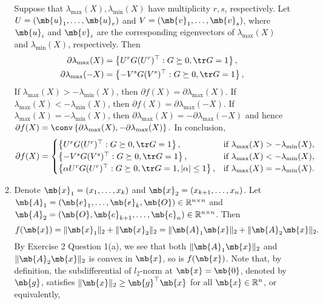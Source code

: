 \begin{exercise}[Subdifferentials]
\begin{enumerate}
\begin{solution}
\begin{enumerate}
            Suppose that $\lambda_{\max}(X),\lambda_{\min}(X)$ have multiplicity $r,s$, respectively. Let $U = (\mb{u}_1,\dots,\mb{u}_r)$ and $V = (\mb{v}_1,\dots,\mb{v}_s)$, where $\mb{u}_i$ and $\mb{v}_i$ are the corresponding eigenvectors of $\lambda_{\max}(X)$ and $\lambda_{\min}(X)$, respectively. Then
            \begin{gather*}
              \partial \lambda_{\max}(X) = \left\{U^r G (U^r)^\top : G \succeq 0, \tr G = 1\right\},\\
              \partial \lambda_{\max}(-X) = \left\{-V^s G (V^s)^\top : G \succeq 0, \tr G = 1\right\},
            \end{gather*}
            If $\lambda_{\max}(X) > -\lambda_{\min}(X)$, then $\partial f(X) = \partial \lambda_{\max}(X)$. If $\lambda_{\max}(X) < -\lambda_{\min}(X)$, then $\partial f(X) = \partial \lambda_{\max}(-X)$. If $\lambda_{\max}(X) = -\lambda_{\min}(X)$, then $\partial \lambda_{\max}(X) = -\partial \lambda_{\max}(-X)$ and hence $\partial f(X) = \conv \left\{\partial \lambda_{\max}(X), -\partial \lambda_{\max}(X)\right\}.$ In conclusion,
            $$
              \partial f(X) = \begin{cases}
                \left\{U^r G (U^r)^\top : G \succeq 0, \tr G = 1\right\},                        & \text{if } \lambda_{\max}(X) > -\lambda_{\min}(X),  \\
                \left\{-V^s G (V^s)^\top : G \succeq 0, \tr G = 1\right\},                       & \text{if } \lambda_{\max}(X) < -\lambda_{\min}(X),  \\
                \left\{\alpha U^r G (U^r)^\top : G \succeq 0, \tr G = 1, |\alpha| \le 1\right\}, & \text{if } \lambda_{\max}(X) = -\lambda_{\min}(X).
              \end{cases}
            $$
          \item Denote $\mb{x}_1 = (x_1,\dots,x_k)$ and $\mb{x}_2 = (x_{k+1},\dots,x_n)$. Let $\mb{A}_1 = (\mb{e}_1,\dots,\mb{e}_k,\mb{O}) \in \mathbb{R}^{n\times n}$ and $\mb{A}_2 = (\mb{O},\mb{e}_{k+1},\dots,\mb{e}_n) \in \mathbb{R}^{n\times n}$. Then $$
              f(\mb{x}) = \|\mb{x}_1\|_2 + \|\mb{x}_2\|_2 = \|\mb{A}_1\mb{x}\|_2 + \|\mb{A}_2\mb{x}\|_2.
            $$
            By Exercise 2 Question 1(a), we see that both $\|\mb{A}_1\mb{x}\|_2$ and $\|\mb{A}_2\mb{x}\|_2$ is convex in $\mb{x}$, so is $f(\mb{x})$. Note that, by definition, the subdifferential of $l_2$-norm at $\mb{x}=\mb{0}$, denoted by $\mb{g}$, satisfies $\|\mb{x}\|_2 \ge \mb{g}^\top\mb{x}$ for all $\mb{x} \in \mathbb{R}^n$, or equivalently, $$
$$
\end{enumerate}
\end{solution}
\end{enumerate}
\end{exercise}
